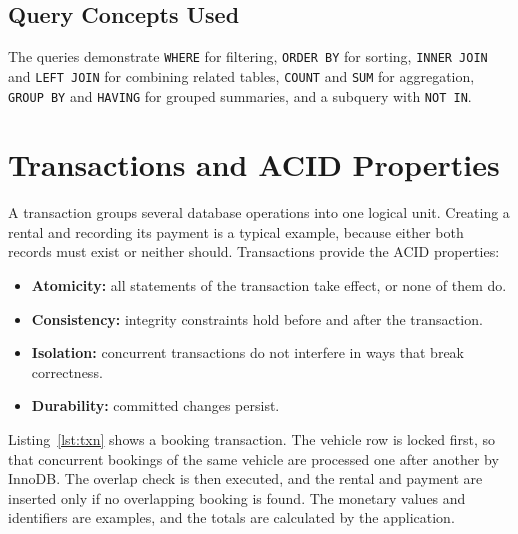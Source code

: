 \documentclass[10pt,a4paper]{report}
\newcommand{\col}[1]{\texttt{#1}}
\begin{document}
\subsection{Query Concepts Used}
The queries demonstrate \col{WHERE} for filtering, \col{ORDER BY} for sorting, \col{INNER JOIN} and \col{LEFT JOIN} for combining related tables, \col{COUNT} and \col{SUM} for aggregation, \col{GROUP BY} and \col{HAVING} for grouped summaries, and a subquery with \col{NOT IN}.

\section{Transactions and ACID Properties}\label{sec:transactions}
A transaction groups several database operations into one logical unit. Creating a rental and recording its payment is a typical example, because either both records must exist or neither should. Transactions provide the ACID properties:
\begin{itemize}
  \item \textbf{Atomicity:} all statements of the transaction take effect, or none of them do.
  \item \textbf{Consistency:} integrity constraints hold before and after the transaction.
  \item \textbf{Isolation:} concurrent transactions do not interfere in ways that break correctness.
  \item \textbf{Durability:} committed changes persist.
\end{itemize}

Listing~\ref{lst:txn} shows a booking transaction. The vehicle row is locked first, so that concurrent bookings of the same vehicle are processed one after another by InnoDB. The overlap check is then executed, and the rental and payment are inserted only if no overlapping booking is found. The monetary values and identifiers are examples, and the totals are calculated by the application.
\end{document}
